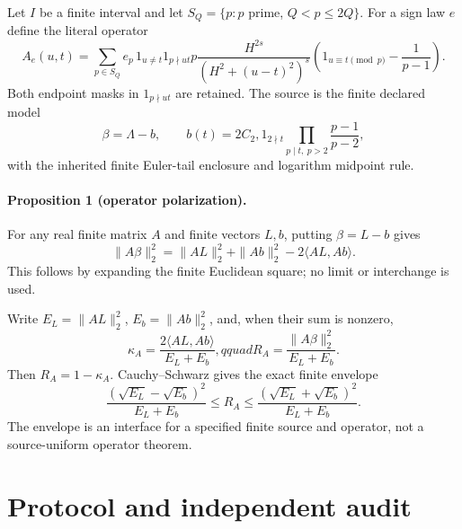 \documentclass[10pt]{article}
\begin{document}
Let $I$ be a finite interval and let $S_Q=\{p: p$ prime, $Q<p\leq 2Q\}$.
For a sign law $e$ define the literal operator
\begin{equation}
 A_e(u,t)=\sum_{p\in S_Q}e_p\,1_{u\ne t}1_{p\nmid ut}
 p\frac{H^{2s}}{(H^2+(u-t)^2)^s}
 \left(1_{u\equiv t\pmod p}-\frac1{p-1}\right).
 \label{eq:operator}
\end{equation}
Both endpoint masks in $1_{p\nmid ut}$ are retained.  The source is the
finite declared model
\begin{equation}
 \beta=\Lambda-b,\qquad
 b(t)=2C_2,1_{2\nmid t}\prod_{p\mid t,\ p>2}\frac{p-1}{p-2},
 \label{eq:source}
\end{equation}
with the inherited finite Euler-tail enclosure and logarithm midpoint rule.

\paragraph{Proposition 1 (operator polarization).}
For any real finite matrix $A$ and finite vectors $L,b$, putting $\beta=L-b$
gives
\begin{equation}
 \|A\beta\|_2^2=\|AL\|_2^2+\|Ab\|_2^2-2\langle AL,Ab\rangle.
 \label{eq:polar}
\end{equation}
This follows by expanding the finite Euclidean square; no limit or
interchange is used.

Write $E_L=\|AL\|_2^2$, $E_b=\|Ab\|_2^2$, and, when their sum is nonzero,
\begin{equation}
 \kappa_A=\frac{2\langle AL,Ab\rangle}{E_L+E_b},qquad
 R_A=\frac{\|A\beta\|_2^2}{E_L+E_b}.
 \label{eq:kappa}
\end{equation}
Then $R_A=1-\kappa_A$.  Cauchy--Schwarz gives the exact finite envelope
\begin{equation}
 \frac{(\sqrt{E_L}-\sqrt{E_b})^2}{E_L+E_b}
 \leq R_A\leq
 \frac{(\sqrt{E_L}+\sqrt{E_b})^2}{E_L+E_b}.
 \label{eq:cauchy}
\end{equation}
The envelope is an interface for a specified finite source and operator, not
a source-uniform operator theorem.

\section{Protocol and independent audit}
\end{document}
